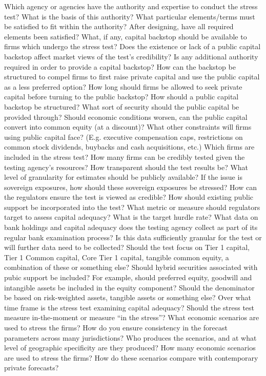 \documentclass[12pt]{article}
\begin{document}
\begin{outline}[enumerate]
\1 Which agency or agencies have the authority and expertise to conduct the stress test?
\2 What is the basis of this authority?
\2 What particular elements/terms must be satisfied to fit within the authority?
\2 After designing, have all required elements been satisfied?
\1 What, if any, capital backstop should be available to firms which undergo the stress test?
\2 Does the existence or lack of a public capital backstop affect market views of the test's credibility?
\2 Is any additional authority required in order to provide a capital backstop?
\2 How can the backstop be structured to compel firms to first raise private capital and use the public capital as a less preferred option?
\2 How long should firms be allowed to seek private capital before turning to the public backstop?
\1 How should a public capital backstop be structured?
\2 What sort of security should the public capital be provided through?
\2 Should economic conditions worsen, can the public capital convert into common equity (at a discount)?
\2 What other constraints will firms using public capital face? (E.g. executive compensation caps, restrictions on common stock dividends, buybacks and cash acquisitions, etc.)
\1 Which firms are included in the stress test?
\2 How many firms can be credibly tested given the testing agency's resources?
\1 How transparent should the test results be? What level of granularity for estimates should be publicly available?
\2 If the issue is sovereign exposures, how should these sovereign exposures be stressed?
\1 How can the regulators ensure the test is viewed as credible?
\2 How should existing public support be incorporated into the test?
\2 What metric or measure should regulators target to assess capital adequacy?
\3 What is the target hurdle rate?
\3 What data on bank holdings and capital adequacy does the testing agency collect as part of its regular bank examination process? Is this data sufficiently granular for the test or will further data need to be collected?
\3 Should the test focus on Tier 1 capital, Tier 1 Common capital, Core Tier 1 capital, tangible common equity, a combination of these or something else?
\4 Should hybrid securities associated with pubic support be included?
\4 For example, should preferred equity, goodwill and intangible assets be included in the equity component?
\4 Should the denominator be based on risk-weighted assets, tangible assets or something else?
\1 Over what time frame is the stress test examining capital adequacy?
\2 Should the stress test measure in-the-moment or measure ``in the stress''?
\1 What economic scenarios are used to stress the firms?
\2 How do you ensure consistency in the forecast parameters across many jurisdictions?
\2 Who produces the scenarios, and at what level of geographic specificity are they produced?
\2 How many economic scenarios are used to stress the firms?
\2 How do these scenarios compare with contemporary private forecasts?

\end{outline}
\end{document}
